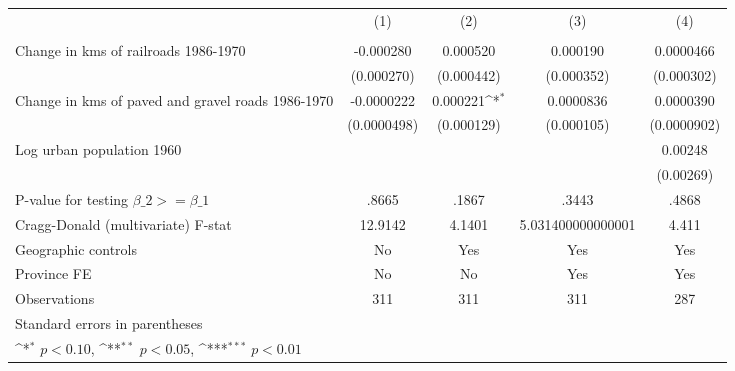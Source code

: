 {
\def\sym#1{\ifmmode^{#1}\else\(^{#1}\)\fi}
\begin{tabular}{l*{4}{c}}
\hline\hline
                &\multicolumn{1}{c}{(1)}&\multicolumn{1}{c}{(2)}&\multicolumn{1}{c}{(3)}&\multicolumn{1}{c}{(4)}\\
                &\multicolumn{1}{c}{}&\multicolumn{1}{c}{}&\multicolumn{1}{c}{}&\multicolumn{1}{c}{}\\
\hline
Change in kms of railroads 1986-1970&-0.000280         & 0.000520         & 0.000190         &0.0000466         \\
                &(0.000270)         &(0.000442)         &(0.000352)         &(0.000302)         \\
[1em]
Change in kms of paved and gravel roads 1986-1970&-0.0000222         & 0.000221\sym{*}  &0.0000836         &0.0000390         \\
                &(0.0000498)         &(0.000129)         &(0.000105)         &(0.0000902)         \\
[1em]
Log urban population 1960&                  &                  &                  &  0.00248         \\
                &                  &                  &                  &(0.00269)         \\
\hline
P-value for testing $\beta\_{2} >= \beta\_{1}$&    .8665         &    .1867         &    .3443         &    .4868         \\
Cragg-Donald (multivariate) F-stat&  12.9142         &   4.1401         &5.031400000000001         &    4.411         \\
Geographic controls&       No         &      Yes         &      Yes         &      Yes         \\
Province FE     &       No         &       No         &      Yes         &      Yes         \\
Observations    &      311         &      311         &      311         &      287         \\
\hline\hline
\multicolumn{5}{l}{\footnotesize Standard errors in parentheses}\\
\multicolumn{5}{l}{\footnotesize \sym{*} \(p<0.10\), \sym{**} \(p<0.05\), \sym{***} \(p<0.01\)}\\
\end{tabular}
}

